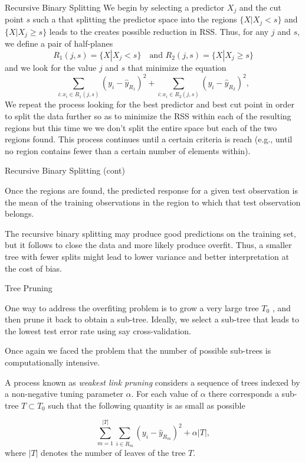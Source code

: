 \documentclass{beamer}
\begin{document}
\begin{frame}{Recursive Binary Splitting}
	We begin by selecting a predictor $X_j$ and the cut point $s$ such a that splitting the predictor space into the regions $\{ X| X_j <s \}$ and $\{ X | X_j \ge s\}$ leads to the creates possible reduction in RSS. Thus, for any $j$ and $s$, we define a pair of half-planes
	\begin{equation}
		R_1(j,s)= \{ X | X_j <s\} \quad \textrm{and } R_2(j,s)= \{X| X_j\ge s\}
		\label{eq:rbs1}
	\end{equation}
and we look for the value $j$ and $s$ that minimize the equation
\begin{equation}
	\sum_{i: x_i \in R_1(j,s)} (y_i - \hat{y}_{R_1})^2 + 	\sum_{i: x_i \in R_2(j,s)} (y_i - \hat{y}_{R_2})^2 ,
	\label{eq:rbs2}
\end{equation}
We repeat the process looking for the best predictor and best cut point in order to split the data further so as to minimize the RSS within each of the resulting regions but this time we we don't split the entire space but each of the two regions found. This process continues until a certain criteria is reach (e.g., until no region contains fewer than a certain number of elements within). 


\end{frame}

\begin{frame}{Recursive Binary Splitting (cont)}

Once the regions are found, the predicted response for a given test observation is the mean of the training observations in the region to which that test observation belongs.

The recursive binary splitting may produce good predictions on the training set, but it follows to close the data and more likely produce overfit. Thus, a smaller tree with fewer splits might lead to lower variance and better interpretation at the cost of bias.
\end{frame}

\begin{frame}{Tree Pruning}
	
	
	One way to address the overfiting problem is to grow a very large tree $T_0$ , and then prune it back to obtain a sub-tree. Ideally, we select a sub-tree that leads to the lowest test error rate using say cross-validation. 
	
	Once again we faced the  problem that the number of possible sub-trees is computationally intensive.
	
	A process known as {\it weakest link pruning} considers a sequence of trees indexed by a non-negative tuning parameter $\alpha$. For each value of $\alpha$ there corresponds a sub-tree $T \subset T_0$ such that the following quantity is as small as possible
	
	\begin{equation}
		\sum_{m=1}^{|T|} \sum_{i\in R_m} (y_i -\hat{y}_{R_m})^2 + \alpha |T|,
	\end{equation}
	 where $|T|$ denotes the number of leaves of the tree $T$.
\end{frame}
\end{document}
